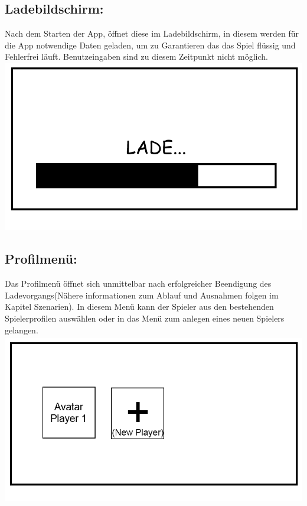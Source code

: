\documentclass{scrartcl}
\begin{document}
\begin{enumerate}
	\begin{minipage}{1\textwidth}
		\item \subsection*{Ladebildschirm:} \label{appaufbau:Ladebildschirm}
		Nach dem Starten der App, öffnet diese im Ladebildschirm, in diesem werden für die App notwendige Daten geladen, um zu Garantieren das das Spiel flüssig und Fehlerfrei läuft. Benutzeingaben sind zu diesem Zeitpunkt nicht möglich.\\
		\includegraphics[width=\textwidth, height=7.5cm]{assets/LoadScreen}
	\end{minipage}
	
	\begin{minipage}{1\textwidth}
		\item \subsection*{Profilmenü:}
		Das Profilmenü öffnet sich unmittelbar nach erfolgreicher Beendigung des Ladevorgangs(Nähere informationen zum Ablauf und Ausnahmen folgen im Kapitel Szenarien).
		In diesem Menü kann der Spieler aus den bestehenden Spielerprofilen auswählen oder in das Menü zum anlegen eines neuen Spielers gelangen.\\
		\includegraphics[width=\textwidth, height=7.5cm]{assets/PlayerScreen}
	\end{minipage}
	

\end{enumerate}
\end{document}
